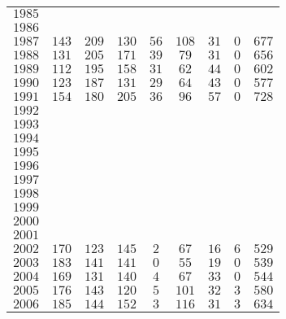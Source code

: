 \begin{longtable}{|l|cccccccc|}
    $1985$  &       &       &       &       &       &       &       &       \\
    $1986$  &       &       &       &       &       &       &       &       \\
    $1987$  & $143$ & $209$ & $130$ & $56$  & $108$ & $31$  & $0$   & $677$ \\
    $1988$  & $131$ & $205$ & $171$ & $39$  & $79$  & $31$  & $0$   & $656$ \\
    $1989$  & $112$ & $195$ & $158$ & $31$  & $62$  & $44$  & $0$   & $602$ \\
    $1990$  & $123$ & $187$ & $131$ & $29$  & $64$  & $43$  & $0$   & $577$ \\
    $1991$  & $154$ & $180$ & $205$ & $36$  & $96$  & $57$  & $0$   & $728$ \\
    $1992$  &       &       &       &       &       &       &       &       \\
    $1993$  &       &       &       &       &       &       &       &       \\
    $1994$  &       &       &       &       &       &       &       &       \\
    $1995$  &       &       &       &       &       &       &       &       \\
    $1996$  &       &       &       &       &       &       &       &       \\
    $1997$  &       &       &       &       &       &       &       &       \\
    $1998$  &       &       &       &       &       &       &       &       \\
    $1999$  &       &       &       &       &       &       &       &       \\
    $2000$  &       &       &       &       &       &       &       &       \\
    $2001$  &       &       &       &       &       &       &       &       \\
    $2002$  & $170$ & $123$ & $145$ & $2$   & $67$  & $16$  & $6$   & $529$ \\
    $2003$  & $183$ & $141$ & $141$ & $0$   & $55$  & $19$  & $0$   & $539$ \\
    $2004$  & $169$ & $131$ & $140$ & $4$   & $67$  & $33$  & $0$   & $544$ \\
    $2005$  & $176$ & $143$ & $120$ & $5$   & $101$ & $32$  & $3$   & $580$ \\
    $2006$  & $185$ & $144$ & $152$ & $3$   & $116$ & $31$  & $3$   & $634$ \\

\end{longtable}
